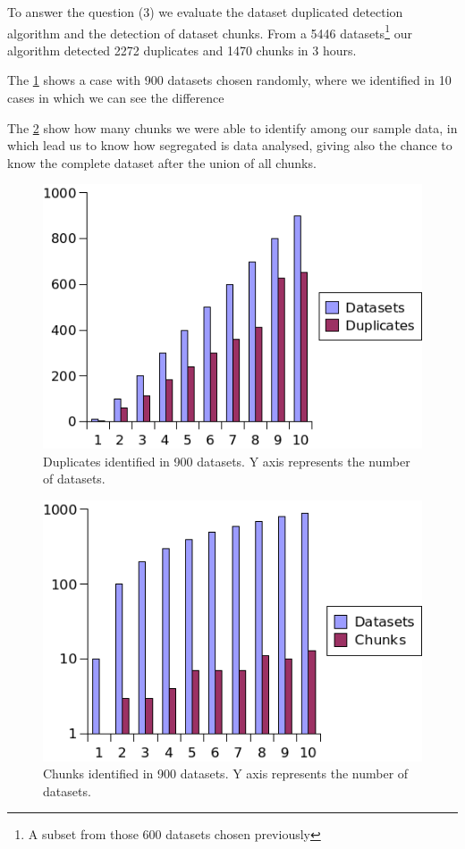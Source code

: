 \documentclass[sw]{iosart2x}
\begin{document}
To answer the question (3) we evaluate the dataset duplicated detection algorithm and the detection of dataset chunks.
From a 5446 datasets\footnote{A subset from those 600 datasets chosen previously} our algorithm detected 2272 duplicates and 1470 chunks in 3 hours.

The \cref{fig:identDuplicates} shows a case with 900 datasets chosen randomly, where we identified in 10 cases in which we can see the difference 

The \cref{fig:identChunks} show how many chunks we were able to identify among our sample data, in which lead us to know how segregated is data analysed, giving also the chance to know the complete dataset after the union of all chunks.

\begin{figure}[htb] 
	\centering
	\includegraphics[width=\linewidth]{img/DsDuplicate.png}
	\caption{Duplicates identified in 900 datasets. Y axis represents the number of datasets.}
	\label{fig:identDuplicates}
\end{figure}

\begin{figure}[htb] 
	\centering
	\includegraphics[width=\linewidth]{img/DsChunks.png}
	\caption{Chunks identified in 900 datasets. Y axis represents the number of datasets.}
	\label{fig:identChunks}
\end{figure}
\end{document}
